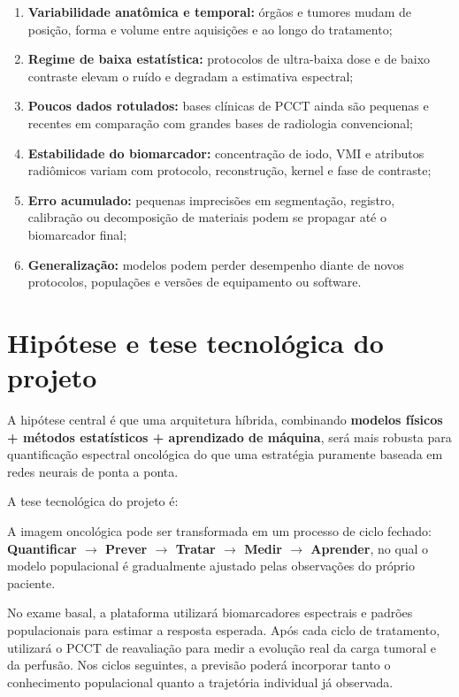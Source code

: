 \documentclass[11pt,a4paper]{article}
\begin{document}
\begin{enumerate}
\item \textbf{Variabilidade anatômica e temporal:} órgãos e tumores mudam de posição, forma e volume entre aquisições e ao longo do tratamento;
\item \textbf{Regime de baixa estatística:} protocolos de ultra-baixa dose e de baixo contraste elevam o ruído e degradam a estimativa espectral;
\item \textbf{Poucos dados rotulados:} bases clínicas de PCCT ainda são pequenas e recentes em comparação com grandes bases de radiologia convencional;
\item \textbf{Estabilidade do biomarcador:} concentração de iodo, VMI e atributos radiômicos variam com protocolo, reconstrução, kernel e fase de contraste;
\item \textbf{Erro acumulado:} pequenas imprecisões em segmentação, registro, calibração ou decomposição de materiais podem se propagar até o biomarcador final;
\item \textbf{Generalização:} modelos podem perder desempenho diante de novos protocolos, populações e versões de equipamento ou software.
\end{enumerate}

\section{Hipótese e tese tecnológica do projeto}

A hipótese central é que uma arquitetura híbrida, combinando \textbf{modelos físicos + métodos estatísticos + aprendizado de máquina}, será mais robusta para quantificação espectral oncológica do que uma estratégia puramente baseada em redes neurais de ponta a ponta.

A tese tecnológica do projeto é:

\begin{caixa}
A imagem oncológica pode ser transformada em um processo de ciclo fechado: \textbf{Quantificar $\rightarrow$ Prever $\rightarrow$ Tratar $\rightarrow$ Medir $\rightarrow$ Aprender}, no qual o modelo populacional é gradualmente ajustado pelas observações do próprio paciente.
\end{caixa}

No exame basal, a plataforma utilizará biomarcadores espectrais e padrões populacionais para estimar a resposta esperada. Após cada ciclo de tratamento, utilizará o PCCT de reavaliação para medir a evolução real da carga tumoral e da perfusão. Nos ciclos seguintes, a previsão poderá incorporar tanto o conhecimento populacional quanto a trajetória individual já observada.
\end{document}
